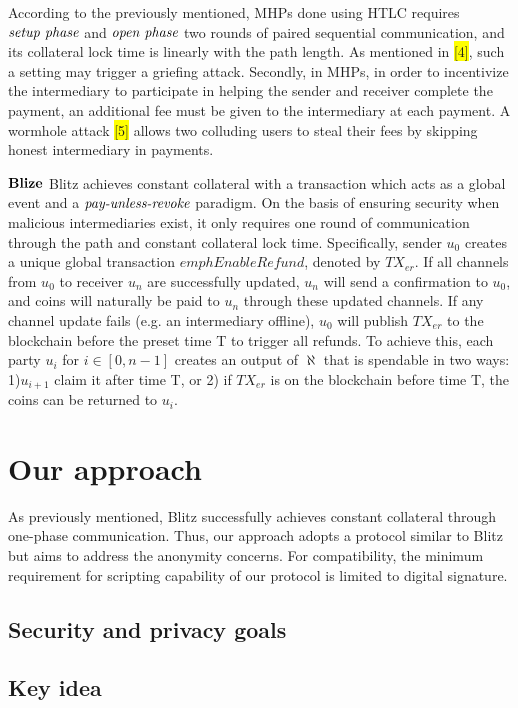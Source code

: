 \documentclass[conference]{IEEEtran}
\begin{document}
According to the previously mentioned, MHPs done using HTLC requires $\emph{setup phase}$ and $\emph{open phase}$ two rounds of paired 
sequential communication, and its collateral lock time is linearly with the path length. As mentioned in \colorbox{yellow}{[4]}, such 
a setting may trigger a griefing attack. Secondly, in MHPs, in order to incentivize the intermediary to participate in helping the sender 
and receiver complete the payment, an additional fee must be given to the intermediary at each payment. A wormhole attack \colorbox{yellow}{[5]} 
allows two colluding users to steal their fees by skipping honest intermediary in payments.

\noindent $\bf{Blize}$   Blitz \cite{blitz} achieves constant collateral with a transaction which acts as a global event and a 
$\emph{pay-unless-revoke}$ paradigm. On the basis of ensuring security when malicious intermediaries exist, it only requires 
one round of communication through the path and constant collateral lock time. Specifically, sender $u_0$ creates a unique global 
transaction $emph{Enable Refund}$, denoted by $TX_{er}$. If all channels from $u_0$ to receiver $u_n$ are successfully updated, $u_n$ 
will send a confirmation to $u_0$, and coins will naturally be paid to $u_n$ through these updated channels. If any channel update 
fails (e.g. an intermediary offline), $u_0$ will publish $TX_{er}$ to the blockchain before the preset time T to trigger all refunds. 
To achieve this, each party $u_i$ for $i \in [0,n-1]$ creates an output of $\aleph$ that is spendable in two ways: 1)$u_{i+1}$ claim it 
after time T, or 2) if $TX_{er}$ is on the blockchain before time T, the coins can be returned to $u_i$.

\section{Our approach}
As previously mentioned, Blitz successfully achieves constant collateral through one-phase communication. Thus, our approach 
adopts a protocol similar to Blitz but aims to address the anonymity concerns. For compatibility, the minimum requirement for 
scripting capability of our protocol is limited to digital signature.  

\subsection{Security and privacy goals}

\subsection{Key idea}
\end{document}
